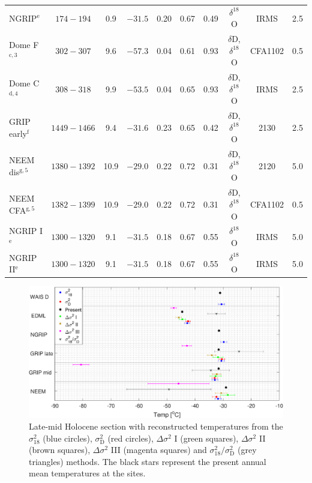 \documentclass[11pt, draftcls, onecolumn]{IEEEtran} %
\numberwithin{equation}{section}
\numberwithin{table}{section}
\numberwithin{figure}{section}
\begin{document}
\begin{table}
\begin{tabular}{l c c c c c c c c c}
		NGRIP$^\mathrm{e}$ &$174-194$ &0.9 &$-31.5$ & 0.20 & 0.67  & 0.49& $\delta^{18}$O&IRMS&2.5\\			
		Dome F$^\mathrm{c,3}$& $302-307$& 9.6 & $-57.3$ &0.04 & 0.61  &  0.93 &$\delta$D, $\delta^{18}$O&CFA1102&0.5\\
		Dome C$^\mathrm{d,4}$ &$308-318$ & 9.9 &$-53.5 $ &0.04 & 0.65 &   0.93&$\delta$D, $\delta^{18}$O&IRMS&2.5\\
		GRIP early$^\mathrm{f}$&$1449-1466$ & 9.4 &$-31.6 $ & 0.23 & 0.65  &  0.42&$\delta$D, $\delta^{18}$O&2130&2.5\\
		NEEM dis$^\mathrm{g,5}$ &$1380-1392 $&10.9 &$-29.0$ & 0.22 &  0.72 &  0.31&$\delta$D, $\delta^{18}$O&2120&5.0\\       
		NEEM CFA$^\mathrm{g,5}$& $1382-1399$& 10.9 &$-29.0 $& 0.22 & 0.72  & 0.31&$\delta$D, $\delta^{18}$O&CFA1102&0.5\\			
		NGRIP I$^\mathrm{e}$&$1300-1320$ &9.1 &$-31.5$ & 0.18 & 0.67  & 0.55& $\delta^{18}$O&IRMS&5.0\\			
		NGRIP II$^\mathrm{e}$ &$1300-1320$ & 9.1 &$-31.5$ & 0.18 & 0.67  & 0.55&$\delta^{18}$O&IRMS&5.0\\				
		\bottomrule	
	\end{tabular}
\end{table}


\begin{figure}[]
	\vspace*{2mm}
	\begin{center}
		\includegraphics[width=\textwidth]{Figure_12}
		\caption{Late-mid Holocene section with reconstructed temperatures from the $\sigma^2_{18}$ (blue circles), 
			$\sigma^2_{\mathrm{D}}$ (red circles), $\Delta\sigma^2$ I (green squares),
			$\Delta\sigma^2$ II (brown squares), $\Delta\sigma^2$ III (magenta squares) and
			${\sigma^2_{18}}/{\sigma^2_\mathrm{D}}$ (grey triangles) methods.
			The black stars represent the present annual mean temperatures at the sites.}  \label{fig:all_temps}
	\end{center}
\end{figure}
\end{document}
